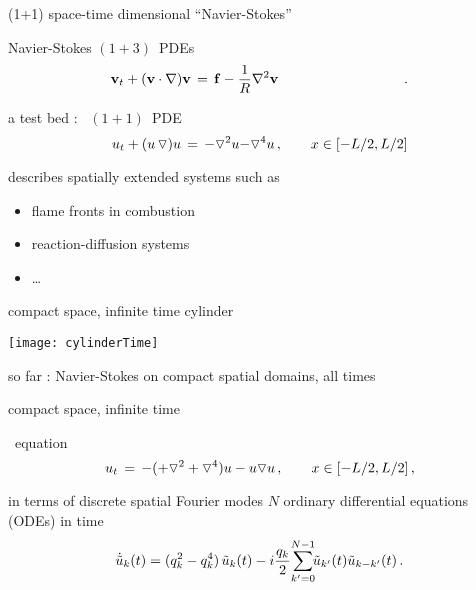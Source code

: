 \begin{frame}{(1+1) space-time dimensional ``Navier-Stokes''}
\begin{block}{Navier-Stokes $(1+3)$\dmn\ PDEs} %
\[
\bv_t + (\bv \cdot \nabla) \bv
	\,=\,
\mathbf{f}
- \frac{1}{R} \nabla ^2 \bv
\qquad\qquad\qquad\qquad\quad.
\]
\end{block}
\begin{block}{a test bed : \KS\ $(1+1)$\dmn\ PDE}
\[
  u_t + (u\,\triangledown) u \,=\,
    {\color{red}-}\triangledown^2 u {\color{red}-\triangledown^4 u}
    \,,\qquad   x \in [-L/2,L/2]
\]
\end{block}

\bigskip
describes spatially extended systems such as
\begin{itemize}
 \item flame fronts in combustion
 \item reaction-diffusion systems
 \item \ldots
\end{itemize}
\end{frame}

\begin{frame}{compact space, infinite time cylinder}
\begin{center}
\texttt{[image: cylinderTime]}
\end{center}
so far : Navier-Stokes on compact spatial domains, all times
\end{frame}

\begin{frame}{compact space, infinite time} %
\begin{block}{\KS\ equation}
\[
  u_t \,=\,
    -({\color{red}+}\triangledown^2 +{\color{red}\triangledown^4}) u
    - u \triangledown u
    \,,\qquad   x \in [-L/2,L/2]
    \,,
\]
\end{block}

\bigskip

\begin{block}{in terms of discrete spatial Fourier modes}
$N$ ordinary differential equations (ODEs) in time
\[
\dot{\Fu}_k(\zeit) = ( q_k^2 - q_k^4 )\, \Fu_k(\zeit)
- i \frac{q_k}{2} \!\sum_{k'=0}^{N-1} \!\!\Fu_{k'}(\zeit) \Fu_{k-k'}(\zeit)
\,.
\]
\end{block}
\end{frame}

